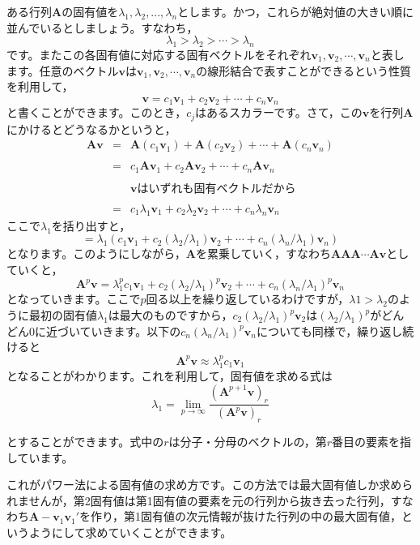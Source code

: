 \documentclass{ltjsbook}
\begin{document}
ある行列$\bm{A}$の固有値を$\lambda_1,\lambda_2,...,\lambda_n$とします。かつ，これらが絶対値の大きい順に並んでいるとしましょう。すなわち，
\[ \lambda_1 > \lambda_2 > \cdots > \lambda_n \]
です。またこの各固有値に対応する固有ベクトルをそれぞれ$\bm{v}_1,\bm{v}_2,\cdots,\bm{v}_n$と表します。任意のベクトル$\bm{v}$は$\bm{v}_1,\bm{v}_2,\cdots,\bm{v}_n$の線形結合で表すことができるという性質を利用して，
\[ \bm{v} = c_1\bm{v}_1 + c_2\bm{v}_2 + \cdots + c_n\bm{v}_n \]
と書くことができます。このとき，$c_j$はあるスカラーです。さて，この$\bm{v}$を行列$\bm{A}$にかけるとどうなるかというと，
\[
	\begin{array}{lll}
		\bm{Av} & = & \bm{A}(c_1\bm{v}_1) + \bm{A}(c_2\bm{v}_2) + \cdots + \bm{A}(c_n\bm{v}_n)     \\
		\\
		        & = & c_1\bm{Av}_1 + c_2\bm{Av}_2 + \cdots + c_n\bm{Av}_n                          \\
		\\
		        &   & \mbox{$\bm{v}$はいずれも固有ベクトルだから}                                                \\
		\\
		        & = & c_1\lambda_1\bm{v}_1 + c_2 \lambda_2\bm{v}_2 + \cdots + c_n\lambda_n\bm{v}_n
	\end{array}
\]
ここで$\lambda_1$を括り出すと，
\[ = \lambda_1(c_1\bm{v}_1 + c_2(\lambda_2/\lambda_1)\bm{v}_2 + \cdots + c_n(\lambda_n/\lambda_1)\bm{v}_n ) \]
となります。このようにしながら，$\bm{A}$を累乗していく，すなわち$\bm{A}\bm{A}\bm{A}\cdots\bm{Av}$としていくと，
\[ \bm{A}^p\bm{v} = \lambda_1^pc_1\bm{v}_1 + c_2(\lambda_2/\lambda_1)^p\bm{v}_2 + \cdots + c_n(\lambda_n/\lambda_1)^p\bm{v}_n \]
となっていきます。ここで$p$回る以上を繰り返しているわけですが，$\lambda1 > \lambda_2$のように最初の固有値$\lambda_1$は最大のものですから，$c_2(\lambda_2/\lambda_1)^p \bm{v}_2$は$(\lambda_2/\lambda_1)^p$がどんどん0に近づいていきます。以下の$c_n(\lambda_n/\lambda_1)^p \bm{v}_n$についても同様で，繰り返し続けると
\[ \bm{A}^p\bm{v} \approx \lambda_1^p c_1 \bm{v}_1 \]
となることがわかります。これを利用して，固有値を求める式は
\[ \lambda_1 = \lim_{p \to \infty}\frac{(\bm{A}^{p+1}\bm{v})_r}{(\bm{A}^p\bm{v})_r} \]

とすることができます。式中の$r$は分子・分母のベクトルの，第$r$番目の要素を指しています。

これがパワー法による固有値の求め方です。この方法では最大固有値しか求められませんが，第2固有値は第1固有値の要素を元の行列から抜き去った行列，すなわち$\bm{A} - \bm{v}_1 \bm{v}_1'$を作り，第1固有値の次元情報が抜けた行列の中の最大固有値，というようにして求めていくことができます。
\end{document}
